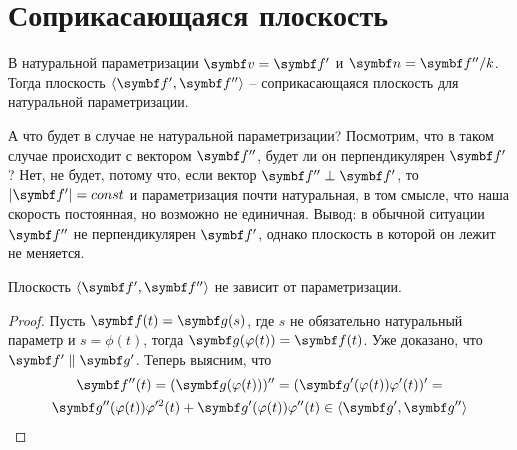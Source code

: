 \documentclass[main]{subfiles}
\begin{document}
\chapter{Соприкасающаяся плоскость}
В натуральной параметризации $\vv = \vf'$ и $\vn = \vf''/k$.
Тогда плоскость $\langle \vf', \vf''\rangle$ -- соприкасающаяся плоскость для натуральной параметризации.

А что будет в случае не натуральной параметризации?
Посмотрим, что в таком случае происходит с вектором $\vf''$, будет ли он перпендикулярен $\vf'$?
Нет, не будет, потому что, если вектор $\vf'' \perp \vf'$, то $|\vf'| = const$
и параметризация почти натуральная, в том смысле, что наша скорость постоянная, но возможно не единичная.
Вывод: в обычной ситуации $\vf''$ не перпендикулярен $\vf'$, однако плоскость в которой он лежит не меняется.

\begin{theorem}
    Плоскость $\langle \vf', \vf''\rangle$ не зависит от параметризации.
\end{theorem}
\begin{proof}
    Пусть $\vf(t) = \vg(s)$, где $s$ не обязательно натуральный параметр и $s = \phi(t)$, тогда $\vg(\phi(t)) = \vf(t)$.
    Уже доказано, что $\vf' \parallel \vg'$.
    Теперь выясним, что
    \begin{multline*}
        \vf''(t) = (\vg(\phi(t)))'' = (\vg'(\phi(t)) \phi'(t))' = \\
        \vg''(\phi(t)) \phi'^2(t) + \vg'(\phi(t)) \phi''(t) \in \langle \vg', \vg''\rangle
    \end{multline*}
\end{proof}
\end{document}
